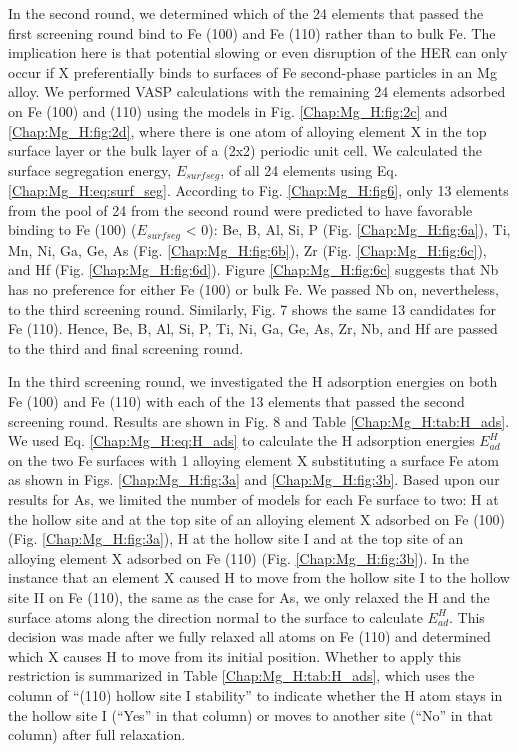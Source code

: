 In the second round, we determined which of the 24 elements that passed the first screening round bind to Fe (100) and Fe (110) rather than to bulk Fe. The implication here is that potential slowing or even disruption of the HER can only occur if X preferentially binds to surfaces of Fe second-phase particles in an Mg alloy. We performed \ac{VASP} calculations with the remaining 24 elements adsorbed on Fe (100) and (110) using the models in Fig. \ref{Chap:Mg_H:fig:2c} and \ref{Chap:Mg_H:fig:2d}, where there is one atom of alloying element X in the top surface layer or the bulk layer of a (2x2) periodic unit cell. We calculated the surface segregation energy, $E_{surf seg}$, of all 24 elements using Eq. \ref{Chap:Mg_H:eq:surf_seg}. According to Fig. \ref{Chap:Mg_H:fig6}, only 13 elements from the pool of 24 from the second round were predicted to have favorable binding to Fe (100) ($E_{surf seg}$ < 0): Be, B, Al, Si, P (Fig. \ref{Chap:Mg_H:fig:6a}), Ti, Mn, Ni, Ga, Ge, As (Fig. \ref{Chap:Mg_H:fig:6b}), Zr (Fig. \ref{Chap:Mg_H:fig:6c}), and Hf (Fig. \ref{Chap:Mg_H:fig:6d}). Figure \ref{Chap:Mg_H:fig:6c} suggests that Nb has no preference for either Fe (100) or bulk Fe. We passed Nb on, nevertheless, to the third screening round. Similarly, Fig. 7 shows the same 13 candidates for Fe (110).  Hence, Be, B, Al, Si, P, Ti, Ni, Ga, Ge, As, Zr, Nb, and Hf are passed to the third and final screening round.



In the third screening round, we investigated the H adsorption energies on both Fe (100) and Fe (110) with each of the 13 elements that passed the second screening round. Results are shown in Fig. 8 and Table \ref{Chap:Mg_H:tab:H_ads}. We used Eq. \ref{Chap:Mg_H:eq:H_ads} to calculate the H adsorption energies $E_{ad}^H$ on the two Fe surfaces with 1 alloying element X substituting a surface Fe atom as shown in Figs. \ref{Chap:Mg_H:fig:3a} and \ref{Chap:Mg_H:fig:3b}. Based upon our results for As, we limited the number of models for each Fe surface to two: H at the hollow site and at the top site of an alloying element X adsorbed on Fe (100) (Fig. \ref{Chap:Mg_H:fig:3a}), H at the hollow site I and at the top site of an alloying element X adsorbed on Fe (110) (Fig. \ref{Chap:Mg_H:fig:3b}). In the instance that an element X caused H to move from the hollow site I to the hollow site II on Fe (110), the same as the case for As, we only relaxed the H and the surface atoms along the direction normal to the surface to calculate $E_{ad}^H$. This decision was made after we fully relaxed all atoms on Fe (110) and determined which X causes H to move from its initial position. Whether to apply this restriction is summarized in Table \ref{Chap:Mg_H:tab:H_ads}, which uses the column of ``(110) hollow site I stability'' to indicate whether the H atom stays in the hollow site I (``Yes'' in that column) or moves to another site (``No'' in that column) after full relaxation.


